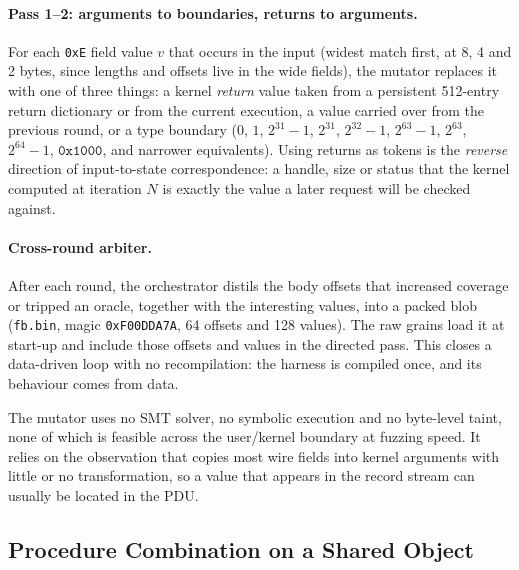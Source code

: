 \documentclass{article}
\begin{document}
\paragraph{Pass 1--2: arguments to boundaries, returns to arguments.} For each
\texttt{0xE} field value $v$ that occurs in the input (widest match first, at
8, 4 and 2 bytes, since lengths and offsets live in the wide fields), the
mutator replaces it with one of three things: a kernel \emph{return} value
taken from a persistent 512-entry return dictionary or from the current
execution, a value carried over from the previous round, or a type boundary
($0$, $1$, $2^{31}{-}1$, $2^{31}$, $2^{32}{-}1$, $2^{63}{-}1$, $2^{63}$,
$2^{64}{-}1$, $\texttt{0x1000}$, and narrower equivalents). Using returns as
tokens is the \emph{reverse} direction of input-to-state correspondence: a
handle, size or status that the kernel computed at iteration $N$ is exactly
the value a later request will be checked against.

\paragraph{Cross-round arbiter.} After each round, the orchestrator distils
the body offsets that increased coverage or tripped an oracle, together with
the interesting values, into a packed blob (\texttt{fb.bin}, magic
\texttt{0xF00DDA7A}, 64 offsets and 128 values). The raw grains load it at
start-up and include those offsets and values in the directed pass. This
closes a data-driven loop with no recompilation: the harness is compiled
once, and its behaviour comes from data.

The mutator uses no SMT solver, no symbolic execution and no byte-level
taint, none of which is feasible across the user/kernel boundary at fuzzing
speed. It relies on the observation that \ksmbd copies most wire fields into
kernel arguments with little or no transformation, so a value that appears in
the record stream can usually be located in the PDU.

\subsection{Procedure Combination on a Shared Object}\label{sec:combine}
\end{document}
